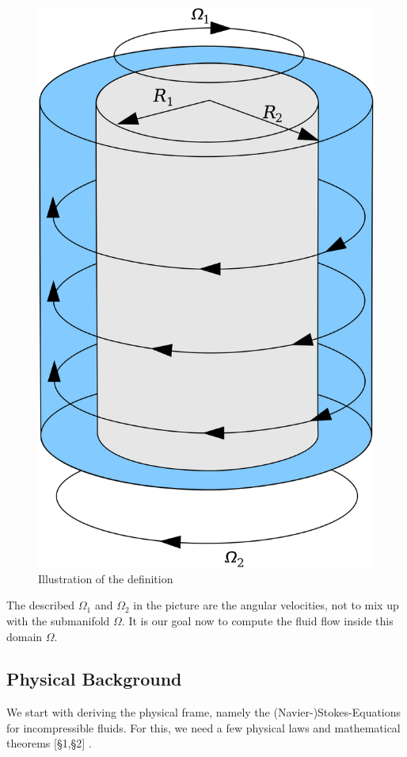 \documentclass[12pt,a4paper]{report}
\begin{document}
\begin{figure}[H]
\centering
\includegraphics[scale=0.1]{1200px-CouetteTaylorSystem.svg.png}
\caption{\label{fig:def}Illustration of the definition\cite{picflow}}
\end{figure}
The described \(\Omega_1\) and \(\Omega_2\) in the picture are the angular velocities, not to mix up with the submanifold \(\Omega\). It is our goal now to compute the fluid flow inside this domain \(\Omega\).
\subsection{Physical Background}
We start with deriving the physical frame, namely the (Navier-)Stokes-Equations for incompressible fluids. For this, we need a few physical laws and mathematical theorems\cite{gibiNavier} \cite{NumFlow}[§1,§2] \cite{MoSi21}.
\end{document}
